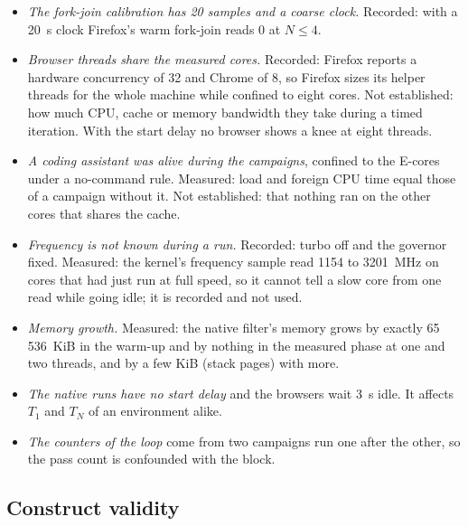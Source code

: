\begin{itemize}[leftmargin=1.5em]
compiler's code.
\item \emph{The fork-join calibration has 20 samples and a coarse clock.}
Recorded: with a 20~\textmu s clock Firefox's warm fork-join reads 0 at
$N \leq 4$.
\item \emph{Browser threads share the measured cores.} Recorded: Firefox
reports a hardware concurrency of 32 and Chrome of 8, so Firefox sizes its
helper threads for the whole machine while confined to eight cores. Not
established: how much CPU, cache or memory bandwidth they take during a
timed iteration. With the start delay no browser shows a knee at eight
threads.
\item \emph{A coding assistant was alive during the campaigns}, confined to
the E-cores under a no-command rule. Measured: load and foreign CPU time
equal those of a campaign without it. Not established: that nothing ran on
the other cores that shares the cache.
\item \emph{Frequency is not known during a run.} Recorded: turbo off and
the governor fixed. Measured: the kernel's frequency sample read 1154 to
3201~MHz on cores that had just run at full speed, so it cannot tell a slow
core from one read while going idle; it is recorded and not used.
\item \emph{Memory growth.} Measured: the native filter's memory grows by
exactly 65\,536~KiB in the warm-up and by nothing in the measured phase at
one and two threads, and by a few KiB (stack pages) with more.
\item \emph{The native runs have no start delay} and the browsers wait 3~s
idle. It affects $T_1$ and $T_N$ of an environment alike.
\item \emph{The counters of the loop} come from two campaigns run one after
the other, so the pass count is confounded with the block.
\end{itemize}

\subsection{Construct validity}

